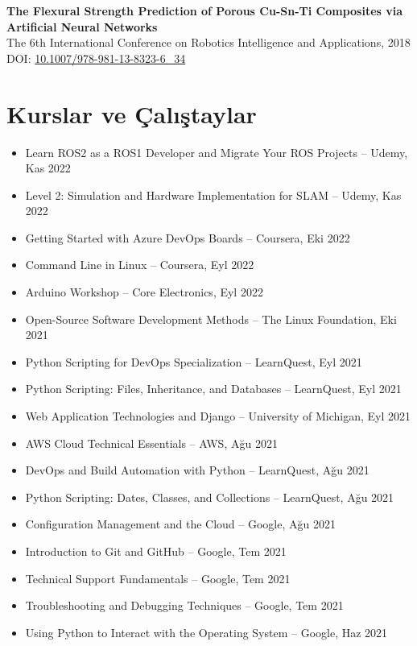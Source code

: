 \documentclass[11pt,a4paper]{article}
\begin{document}
\textbf{\color{PrimaryColor}The Flexural Strength Prediction of Porous Cu-Sn-Ti Composites via Artificial Neural Networks}\\
The 6th International Conference on Robotics Intelligence and Applications, 2018\\
DOI:
\href{https://doi.org/10.1007/978-981-13-8323-6_34}
{10.1007/978-981-13-8323-6\_34}

\section*{Kurslar ve Çalıştaylar}

\begin{itemize}
    \item Learn ROS2 as a ROS1 Developer and Migrate Your ROS Projects -- Udemy, Kas 2022
    \item Level 2: Simulation and Hardware Implementation for SLAM -- Udemy, Kas 2022
    \item Getting Started with Azure DevOps Boards -- Coursera, Eki 2022
    \item Command Line in Linux -- Coursera, Eyl 2022
    \item Arduino Workshop -- Core Electronics, Eyl 2022
    \item Open-Source Software Development Methods -- The Linux Foundation, Eki 2021
    \item Python Scripting for DevOps Specialization -- LearnQuest, Eyl 2021
    \item Python Scripting: Files, Inheritance, and Databases -- LearnQuest, Eyl 2021
    \item Web Application Technologies and Django -- University of Michigan, Eyl 2021
    \item AWS Cloud Technical Essentials -- AWS, Ağu 2021
    \item DevOps and Build Automation with Python -- LearnQuest, Ağu 2021
    \item Python Scripting: Dates, Classes, and Collections -- LearnQuest, Ağu 2021
    \item Configuration Management and the Cloud -- Google, Ağu 2021
    \item Introduction to Git and GitHub -- Google, Tem 2021
    \item Technical Support Fundamentals -- Google, Tem 2021
    \item Troubleshooting and Debugging Techniques -- Google, Tem 2021
    \item Using Python to Interact with the Operating System -- Google, Haz 2021

\end{itemize}
\end{document}
